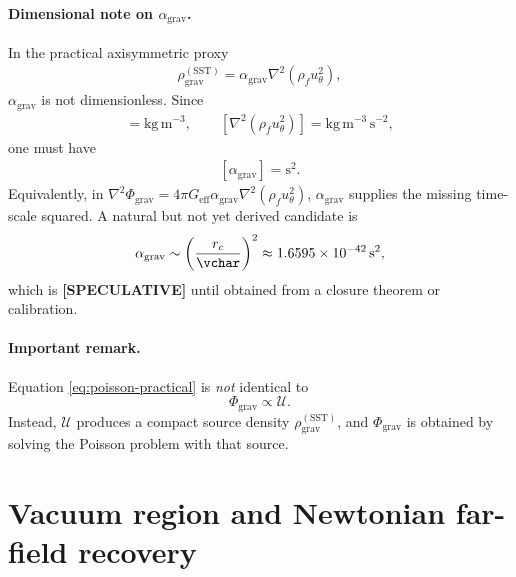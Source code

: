 \documentclass[11pt]{article}
\newcommand{\rhoF}{\rho_{\!f}}
\newcommand{\rc}{{r_c}}
\newcommand{\eff}{\mathrm{eff}}
\newcommand{\SST}{\mathrm{SST}}
\newcommand{\grav}{\mathrm{grav}}
\begin{document}
        \paragraph{Dimensional note on \(\alpha_{\grav}\).}
        In the practical axisymmetric proxy
        \begin{align}
            \rho_{\grav}^{(\SST)}
            =
            \alpha_{\grav}\nabla^2(\rhoF u_\theta^2),
        \end{align}
        \(\alpha_{\grav}\) is not dimensionless.  Since
        \begin{align}
            [\rho_{\grav}^{(\SST)}]=\mathrm{kg\,m^{-3}},
            \qquad
            [\nabla^2(\rhoF u_\theta^2)]
            =
            \mathrm{kg\,m^{-3}\,s^{-2}},
        \end{align}
        one must have
        \begin{align}
            \boxed{[\alpha_{\grav}]=\mathrm{s^2}.}
        \end{align}
        Equivalently, in
        \(\nabla^2\Phi_{\grav}=4\pi G_{\eff}\alpha_{\grav}\nabla^2(\rhoF u_\theta^2)\),
        \(\alpha_{\grav}\) supplies the missing time-scale squared.  A natural but not
        yet derived candidate is
        \begin{align}
            \alpha_{\grav}
            \sim
            \left(\frac{\rc}{\vchar}\right)^2
            \approx
            1.6595\times10^{-42}\,\mathrm{s^2},
        \end{align}
        which is \textbf{[SPECULATIVE]} until obtained from a closure theorem or
        calibration.
        
        \paragraph{Important remark.}
            Equation \eqref{eq:poisson-practical} is \emph{not} identical to
            \[
                \Phi_{\grav}\propto \mathcal{U}.
            \]
            Instead, \(\mathcal{U}\) produces a compact source density \(\rho_{\grav}^{(\SST)}\), and \(\Phi_{\grav}\) is obtained by solving the Poisson problem with that source.
        
        \section{Vacuum region and Newtonian far-field recovery}
        
\end{document}
